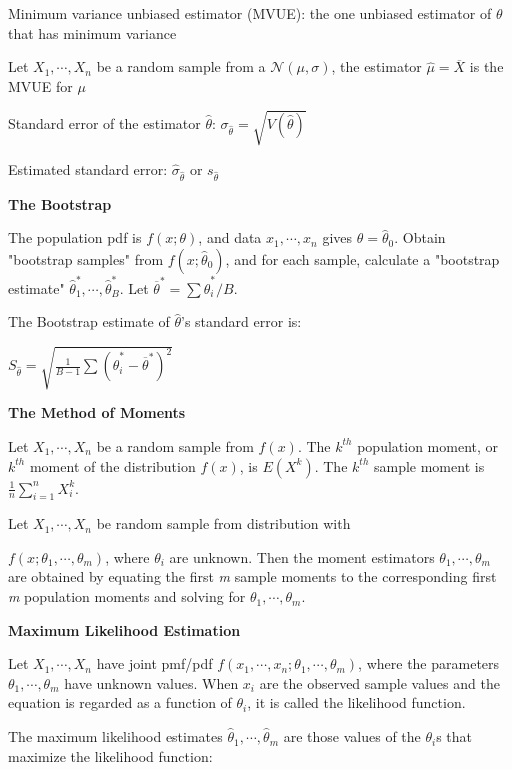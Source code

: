 \documentclass{article}
\newcommand{\bigtitle}[1]{
	\noindent
	\textbf{#1}
}
\begin{document}
	Minimum variance unbiased estimator (MVUE): the one unbiased estimator of $\theta$ that has minimum variance
	
	Let $X_1,\cdots,X_n$ be a random sample from a $\mathcal{N} (\mu, \sigma)$, the estimator $\hat{\mu} = \overline{X}$ is the MVUE for $\mu$
	
	Standard error of the estimator $\hat{\theta}$: $\sigma_{\hat{\theta}} = \sqrt{V(\hat{\theta})}$
	
	Estimated standard error: $\hat{\sigma}_{\hat{\theta}}$ or $s_{\hat{\theta}}$
	
	

	\bigtitle{The Bootstrap}
	
	The population pdf is $f(x;\theta)$, and data $x_1,\cdots,x_n$ gives $\hat{\theta} = \hat{\theta}_0$. 
	Obtain "bootstrap samples" from $f (x;\hat{\theta}_0)$, and for each sample, calculate a "bootstrap estimate" $\hat{\theta}_1^*,\cdots,\hat{\theta}_B^*$.
	Let $\overline{\theta}^* = \sum \hat{\theta}_i^*/B$.
	
	The Bootstrap estimate of $\hat{\theta}$'s standard error is:
	
	$S_{\hat{\theta}} = \sqrt{\frac{1}{B-1}\sum(\hat{\theta}_i^*-\overline{\theta}^*)^2}$
	
	
	
	\bigtitle{The Method of Moments}
	
	Let $X_1,\cdots, X_n$ be a random sample from $f(x)$.
	The $k^{th}$ population moment, or $k^{th}$ moment of the distribution $f(x)$, is $E(X^k)$.
	The $k^{th}$ sample moment is $\frac{1}{n}\sum _{i=1}^n X_i^k$.
	
	
	Let $X_1,\cdots, X_n$ be random sample from distribution with 
	
	\noindent
	$ f(x; \theta_1,\cdots, \theta_m) $, where $ \theta_i $ are unknown.
	Then the moment estimators $ \theta_1,\cdots, \theta_m $ are obtained by equating the first \textit{m} sample moments to the corresponding first \textit{m} population moments and solving for $ \theta_1,\cdots, \theta_m $.
	
	\bigtitle{Maximum Likelihood Estimation}
	
	Let $X_1,\cdots, X_n$ have joint pmf/pdf 
	$f(x_1, \cdots, x_n; \theta_1, \cdots, \theta_m)$,
	where the parameters $ \theta_1, \cdots, \theta_m $ have unknown values. When $ x_i $ are the observed sample values and the equation is regarded as a function of $ \theta_i $, it is called the likelihood function. 
	
	The maximum likelihood estimates $ \hat{\theta}_1,\cdots,\hat{\theta}_m  $
	are those values of the $ \theta_i $s that maximize the likelihood function:
	
\end{document}
